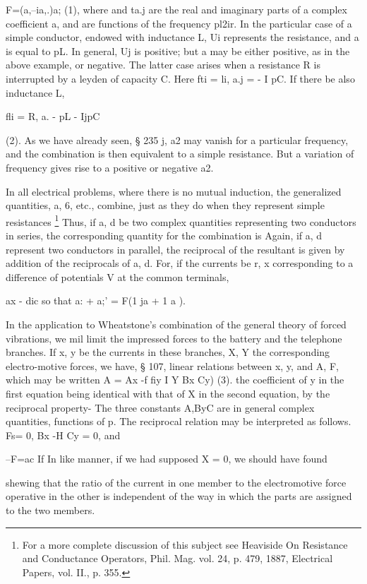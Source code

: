 F=(a,--ia,.)a; (1),
where and ta.j are the real and imaginary parts of a complex coefficient a, and
are functions of the frequency pl2ir. In the particular case of a simple
conductor, endowed with inductance L, Ui represents the resistance, and a is
equal to pL. In general, Uj is positive; but a may be either positive, as in
the above example, or negative. The latter case arises when a resistance R is
interrupted by a leyden of capacity C. Here fti = li, a.j = - I pC.  If there
be also inductance L,

fli = R, a. - pL - IjpC

(2).  As we have already seen, § 235 j, a2 may vanish
for a particular frequency, and the combination is then equivalent to a simple
resistance. But a variation of frequency gives rise to a positive or
negative a2.

In all electrical problems, where there is no mutual induction,
the generalized quantities, a, 6, etc., combine, just as they do when they
represent simple resistances
\footnote{
For a more complete discussion of this subject
see Heaviside On Resistance and Conductance Operators, Phil. Mag. vol. 24, p.
479, 1887, Electrical Papers, vol. II., p. 355.}
Thus, if a, d be two complex quantities
representing two conductors in series, the corresponding quantity for the
combination is Again, if a, d represent
two conductors in parallel, the reciprocal of the resultant is given by
addition of the reciprocals of a, d. For, if the currents be r, x
corresponding to a difference of potentials V at the common terminals,

ax - dic so that a: + a;' = F(1 ja + 1  a ).

In the application to
Wheatstone’s combination of the general theory of forced vibrations, we mil
limit the impressed forces to the battery and the telephone branches. If x, y
be the currents in these branches, X, Y the corresponding electro-motive
forces, we have, § 107, linear relations between x, y, and A, F, which may be
written A = Ax -f fiy I Y Bx Cy) (3).  the coefficient of y in the first
equation being identical with that of X in the second equation, by the
reciprocal property- The three constants A,ByC are in general complex
quantities, functions of p.  The reciprocal relation may be interpreted as
follows.  Fs= 0, Bx -H Cy = 0, and

 --F=ac If In like manner, if we had supposed X = 0, we should have found

shewing that the ratio of the current in one member to the electromotive force
operative in the other is independent of the way in which the parts are
assigned to the two members.

